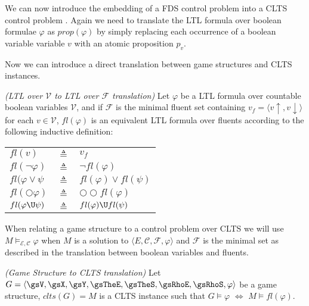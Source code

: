 We can now introduce the embedding of a FDS control problem \fdsControlProblemDef into a CLTS control problem \cltsCPEmbeddingDef.
Again we need to translate the LTL formula over boolean formulae $\varphi$ as $prop(\varphi)$ by simply  replacing each occurrence of a boolean variable variable $v$ with an atomic proposition $p_v$.





Now we can introduce a direct translation between game structures and CLTS instances.

\begin{definition}
	\label{def:fl_ltl} \emph{(LTL over $\mathcal{V}$ to LTL over $\mathcal{F}$ translation)} 
	Let $\varphi$ be a LTL formula over countable boolean variables $\mathcal{V}$, and if $\mathcal{F}$ is the minimal fluent set containing $v_f = \langle v\uparrow, v\downarrow \rangle$ for each $v \in \mathcal{V}$, $fl(\varphi)$ is an equivalent LTL formula over fluents according to the following inductive definition:\\
	
	\begin{tabular}{ l c l }
		$fl(v)$ & $\triangleq$ & $v_f$\\	
		$fl(\neg \varphi)$ & $\triangleq$ & $\neg fl(\varphi)$\\
		$fl(\varphi \vee \psi$ & $\triangleq$ & $fl(\varphi) \vee fl(\psi)$\\
		$fl(\bigcirc \varphi)$ & $\triangleq$ & $\bigcirc\bigcirc fl(\varphi)$\\
		$fl(\varphi \U \psi)$ & $\triangleq$ & $fl(\varphi) \U fl(\psi)$\\
	\end{tabular}	
\end{definition}

When relating a game structure to a control problem over CLTS we will use $M \models_{\mathcal{E,C}}\varphi$ when $M$ is a solution to $\langle E, \mathcal{C}, \mathcal{F}, \varphi \rangle$ and $\mathcal{F}$ is the minimal set as described in the translation between boolean variables and fluents.

\begin{definition}
	\label{def:gs_to_clts_translation} \emph{(Game Structure to CLTS translation)} 
	Let $G =  \langle \gsV, \gsX, \gsY, \gsTheE, \gsTheS, \gsRhoE, \gsRhoS, \varphi \rangle$ be a game structure, $clts(G)=M$ is a CLTS instance such that $G \models \varphi$ $\iff$ $M \models fl(\varphi)$.
\end{definition}


